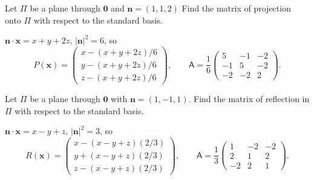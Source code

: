 \documentclass[10pt,notitlepage]{revtex4-1}
\newenvironment{example}[1][Example]{\begin{trivlist}
\item[\hskip \labelsep {\bfseries #1}]}{\end{trivlist}}
\newcommand{\xb}{\boldsymbol{x}}
\newcommand{\nb}{{\boldsymbol{n}}}
\begin{document}
\begin{example}
	Let $\Pi$ be a plane through $\boldsymbol{0}$ and $\nb=(1,1,2)$ Find the
	matrix of projection onto $\Pi$ with respect to the standard basis.
	
	$\nb\cdot\xb=x+y+2z$, $|\nb|^2=6$, so
	\begin{equation}
		P(\xb)=\begin{pmatrix}x-(x+y+2z)/6\\y-(x+y+2z)/6\\
		z-(x+y+2z)/6\end{pmatrix},\qquad \mathsf{A}=\frac{1}{6}\begin{pmatrix}
		5 & -1 & -2 \\ -1 & 5 & -2 \\ -2 & -2 & 2\end{pmatrix}.
	\end{equation}
\end{example}

\begin{example}
	Let $\Pi$ be a plane through $\boldsymbol{0}$ with $\nb=(1,-1,1)$. Find the
	matrix of reflection in $\Pi$ with respect to the standard basis.
	
	$\nb\cdot\xb=x-y+z$, $|\nb|^2=3$, so
	\begin{equation}
		R(\xb)=\begin{pmatrix}x-(x-y+z)(2/3)\\y+(x-y+z)(2/3)\\
		z-(x-y+z)(2/3)\end{pmatrix},\qquad \mathsf{A}=\frac{1}{3}\begin{pmatrix}
		1 & -2 & -2 \\ 2 & 1 & 2 \\ -2 & 2 & 1\end{pmatrix}.
	\end{equation}
\end{example}
\end{document}
